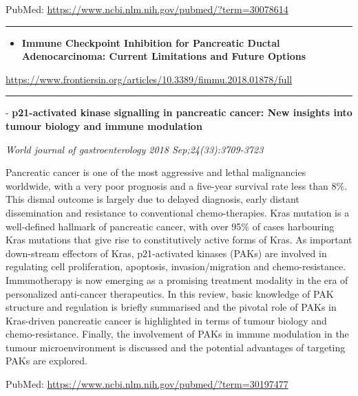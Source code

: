\documentclass[]{article}
\providecommand{\tightlist}{%
  \setlength{\itemsep}{0pt}\setlength{\parskip}{0pt}}
\begin{document}
PubMed: \url{https://www.ncbi.nlm.nih.gov/pubmed/?term=30078614}

{}

{}

\begin{center}\rule{0.5\linewidth}{\linethickness}\end{center}

\begin{itemize}
\tightlist
\item
  \textbf{Immune Checkpoint Inhibition for Pancreatic Ductal
  Adenocarcinoma: Current Limitations and Future Options}
\end{itemize}

\url{https://www.frontiersin.org/articles/10.3389/fimmu.2018.01878/full}

\begin{center}\rule{0.5\linewidth}{\linethickness}\end{center}

 - \textbf{p21-activated kinase signalling in pancreatic cancer: New
insights into tumour biology and immune modulation}

\emph{World journal of gastroenterology 2018 Sep;24(33):3709-3723}

Pancreatic cancer is one of the most aggressive and lethal malignancies
worldwide, with a very poor prognosis and a five-year survival rate less
than 8\%. This dismal outcome is largely due to delayed diagnosis, early
distant dissemination and resistance to conventional chemo-therapies.
Kras mutation is a well-defined hallmark of pancreatic cancer, with over
95\% of cases harbouring Kras mutations that give rise to constitutively
active forms of Kras. As important down-stream effectors of Kras,
p21-activated kinases (PAKs) are involved in regulating cell
proliferation, apoptosis, invasion/migration and chemo-resistance.
Immunotherapy is now emerging as a promising treatment modality in the
era of personalized anti-cancer therapeutics. In this review, basic
knowledge of PAK structure and regulation is briefly summarised and the
pivotal role of PAKs in Kras-driven pancreatic cancer is highlighted in
terms of tumour biology and chemo-resistance. Finally, the involvement
of PAKs in immune modulation in the tumour microenvironment is discussed
and the potential advantages of targeting PAKs are explored.

PubMed: \url{https://www.ncbi.nlm.nih.gov/pubmed/?term=30197477}

{}

{}
\end{document}
